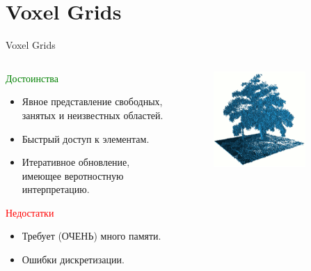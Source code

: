 \documentclass[9pt]{beamer}
\begin{document}

\section{Voxel Grids}

\begin{frame}{Voxel Grids}
\begin{columns}
\begin{column}{0.50\textwidth}
  \begin{block}{\textcolor{green}{Достоинства}}
    \begin{itemize}
    \item
    { 
      Явное представление свободных, занятых и неизвестных областей.
    }
    \item
    {
      Быстрый доступ к элементам.
    }
    \item
    {
      Итеративное обновление, имеющее веротностную интерпретацию.
    }
    \end{itemize}
  \end{block}

  \begin{block}{\textcolor{red}{Недостатки}}
    \begin{itemize}
    \item
    { 
      Требует (ОЧЕНЬ) много памяти.
    }
    \item
    {
      Ошибки дискретизации.
    }
    \end{itemize}
  \end{block}
\end{column}
\begin{column}{0.50\textwidth}
\begin{figure}[h]
    \centering
    \includegraphics[width=0.8\textwidth]{octomap_tree.png}
\end{figure}
\end{column}
\end{columns}
\end{frame}
\end{document}
